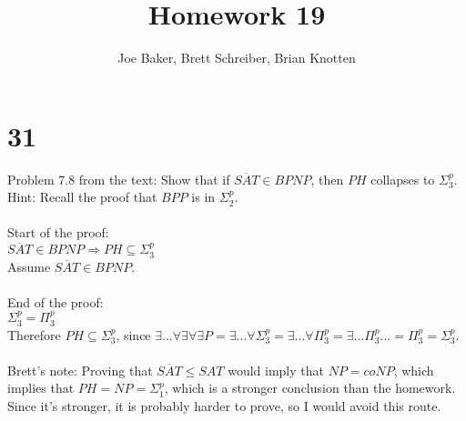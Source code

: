 \documentclass[letterpaper,notitlepage,twoside]{article}
\renewcommand{\implies}{\Rightarrow} %
\begin{document}
\title{Homework 19}
\author{Joe Baker, Brett Schreiber, Brian Knotten}
\maketitle

\section*{31}
Problem 7.8 from the text: Show that if $\overline{SAT} \in BPNP$, then $PH$ collapses to $\Sigma_3^p$. \\
Hint: Recall the proof that $BPP$ is in $\Sigma_2^p$.
\\\\

Start of the proof: \\
$\overline{SAT} \in BPNP \implies PH \subseteq \Sigma_3^p$ \\
Assume $\overline{SAT} \in BPNP$. \\\\

End of the proof: \\
$\Sigma_3^p = \Pi_3^p$ \\
Therefore $PH \subseteq \Sigma_3^p$, since $\exists...\forall\exists\forall\exists P = \exists...\forall\Sigma_3^p = \exists...\forall\Pi_3^p = \exists...\Pi_3^p ... = \Pi_3^p = \Sigma_3^p$.
\\\\

Brett's note:
Proving that $\overline{SAT} \leq SAT$ would imply that $NP = coNP$, which implies that $PH = NP = \Sigma_1^p$, which is a stronger conclusion than the homework. Since it's stronger, it is probably harder to prove, so I would avoid this route.
\end{document}
